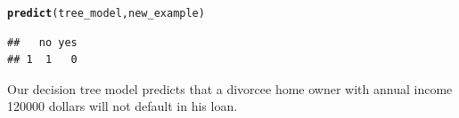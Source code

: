 \documentclass[11pt, a4paper]{article}\usepackage[]{graphicx}\usepackage[]{xcolor}
\makeatletter
\newcommand{\hldef}[1]{\textcolor[rgb]{0.345,0.345,0.345}{#1}}%
\newcommand{\hlkwd}[1]{\textcolor[rgb]{0.737,0.353,0.396}{\textbf{#1}}}%
\newenvironment{kframe}{%
 \def\at@end@of@kframe{}%
 \ifinner\ifhmode%
  \def\at@end@of@kframe{\end{minipage}}%
  \begin{minipage}{\columnwidth}%
 \fi\fi%
 \def\FrameCommand##1{\hskip\@totalleftmargin \hskip-\fboxsep
 \colorbox{shadecolor}{##1}\hskip-\fboxsep
     \hskip-\linewidth \hskip-\@totalleftmargin \hskip\columnwidth}%
 \MakeFramed {\advance\hsize-\width
   \@totalleftmargin\z@ \linewidth\hsize
   \@setminipage}}%
 {\par\unskip\endMakeFramed%
 \at@end@of@kframe}
\newenvironment{knitrout}{}{} %
\makeatother
\begin{document}
\begin{knitrout}
\color{fgcolor}\begin{kframe}
\begin{alltt}
\hlkwd{predict}\hldef{(tree_model, new_example)}
\end{alltt}
\begin{verbatim}
##   no yes
## 1  1   0
\end{verbatim}
\end{kframe}
\end{knitrout}

{\setlength{\spaceskip}{1em plus 0.5em minus 0.5em} \fontsize{17}{20}\myfont Our decision tree model predicts that a divorcee home owner with annual income 120000 dollars will not default in his loan. \par}
\end{document}
